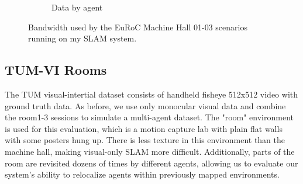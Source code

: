 \begin{figure}[h]
\begin{subfigure}[b]{0.45\linewidth}
        \caption{Data by agent}
    \end{subfigure}%

    \caption{Bandwidth used by the EuRoC Machine Hall 01-03 scenarios running on my SLAM system.}
    \label{fig:euroc-mh-01-02-bandwith}
\end{figure}

\subsection{TUM-VI Rooms}
\label{sec:tum-rooms}
The TUM visual-intertial dataset \autocite{8593419} consists of handheld fisheye 512x512 video with ground truth data. As before, we use only monocular visual data and combine the room1-3 sessions to simulate a multi-agent dataset. The "room" environment is used for this evaluation, which is a motion capture lab with plain flat walls with some posters hung up. There is less texture in this environment than the machine hall, making visual-only SLAM more difficult. Additionally, parts of the room are revisited dozens of times by different agents, allowing us to evaluate our system's ability to relocalize agents within previously mapped environments.


